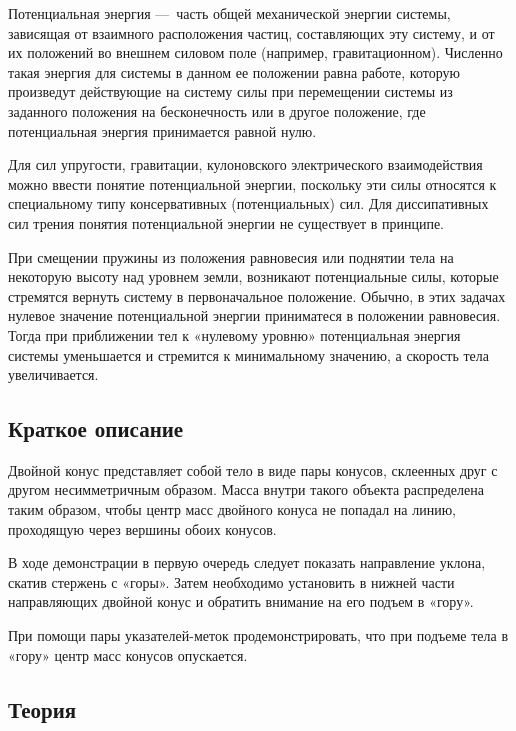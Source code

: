 \documentclass[All.tex]{subfiles}
\begin{document}
	Потенциальная энергия — часть общей механической энергии системы, зависящая от взаимного расположения частиц, составляющих эту систему, и от их положений во внешнем силовом поле (например, гравитационном).
	Численно такая энергия для системы в данном ее положении равна работе, которую произведут действующие на систему силы при перемещении системы из заданного положения на бесконечность или в другое положение, где потенциальная энергия принимается равной нулю.
	
	Для сил упругости, гравитации, кулоновского электрического взаимодействия можно ввести понятие потенциальной энергии, поскольку эти силы относятся к специальному типу консервативных (потенциальных) сил.
	Для диссипативных сил трения понятия потенциальной энергии не существует в принципе.
	
	При смещении пружины из положения равновесия или поднятии тела на некоторую высоту над уровнем земли, возникают потенциальные силы, которые стремятся вернуть систему в первоначальное положение.
	Обычно, в этих задачах нулевое значение потенциальной энергии приниматеся в положении равновесия.
	Тогда при приближении тел к «нулевому уровню» потенциальная энергия системы уменьшается и стремится к минимальному значению, а скорость тела увеличивается.
	
	\subsection*{\textcolor{PineGreen}{Краткое описание}}
		
		Двойной конус представляет собой тело в виде пары конусов, склеенных друг с другом несимметричным образом.
		Масса внутри такого объекта распределена таким образом, чтобы центр масс двойного конуса не попадал на линию, проходящую через вершины обоих конусов. %
		
		В ходе демонстрации в первую очередь следует показать направление уклона, скатив стержень с «горы».
		Затем необходимо установить в нижней части направляющих двойной конус и обратить внимание на его подъем в «гору».
		
		При помощи пары указателей-меток продемонстрировать, что при подъеме тела в «гору» центр масс конусов опускается.


		\subsection*{\textcolor{PineGreen}{Теория}}
\end{document}
